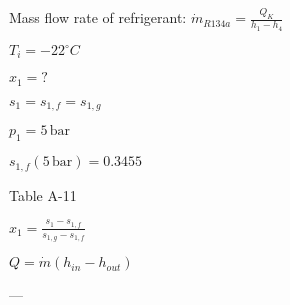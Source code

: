 Mass flow rate of refrigerant: \( \dot{m}_{R134a} = \frac{Q_K}{h_1 - h_4} \)  

\( T_i = -22^\circ C \)  

\( x_1 = ? \)  

\( s_1 = s_{1,f} = s_{1,g} \)  

\( p_1 = 5 \, \text{bar} \)  

\( s_{1,f} (5 \, \text{bar}) = 0.3455 \)  

Table A-11  

\( x_1 = \frac{s_1 - s_{1,f}}{s_{1,g} - s_{1,f}} \)  

\( Q = \dot{m} (h_{in} - h_{out}) \)  

---